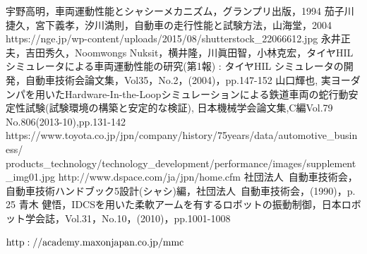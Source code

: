 \documentclass[a4paper,12pt]{article_vdlab_sotsuron}
\begin{document}
\newpage
\begin{thebibliography}{99}
宇野高明，車両運動性能とシャシーメカニズム，グランプリ出版，1994
茄子川捷久，宮下義孝，汐川満則，自動車の走行性能と試験方法，山海堂，2004
https://nge.jp/wp-content/uploads/2015/08/shutterstock\_22066612.jpg
永井正夫，吉田秀久，Noomwongs Nuksit，横井隆，川眞田智，小林克宏，タイヤHIL シミュレータによる車両運動性能の研究(第1報) : タイヤHIL シミュレータの開発，自動車技術会論文集，Vol35，No.2，(2004)，pp.147-152
山口輝也, 実ヨーダンパを用いたHardware-In-the-Loopシミュレーションによる鉄道車両の蛇行動安定性試験(試験環境の構築と安定的な検証), 日本機械学会論文集,C編Vol.79 No.806(2013-10),pp.131-142
https://www.toyota.co.jp/jpn/company/history/75years/data/automotive\_business/ \\ products\_technology/technology\_development/performance/images/supplement\_img01.jpg
http://www.dspace.com/ja/jpn/home.cfm
社団法人\ 自動車技術会，自動車技術ハンドブック5設計(シャシ)編，社団法人\ 自動車技術会，(1990)，p. 25
青木 健悟，IDCSを用いた柔軟アームを有するロボットの振動制御，日本ロボット学会誌，Vol.31，No.10，(2010)，pp.1001-1008

$\rm{http://academy.maxonjapan.co.jp/mmc}$

\end{thebibliography}
\end{document}

